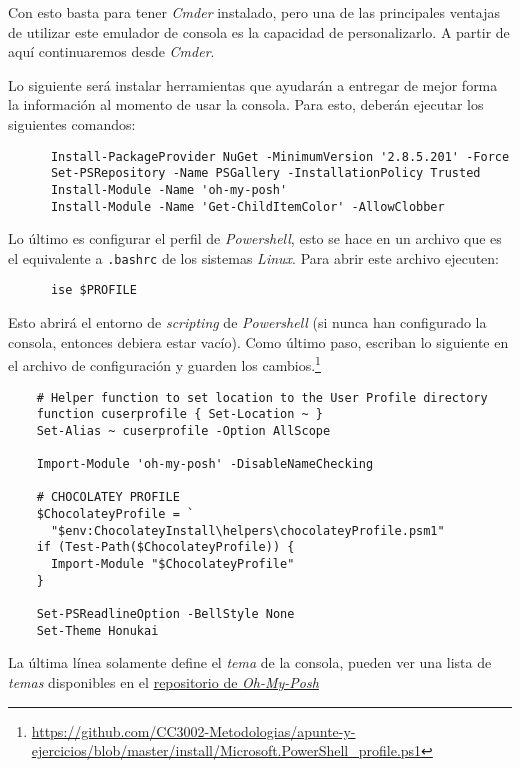     Con esto basta para tener \textit{Cmder} instalado, pero una de las principales ventajas
    de utilizar este emulador de consola es la capacidad de personalizarlo.
    A partir de aquí continuaremos desde \textit{Cmder}.
    
    Lo siguiente será instalar herramientas que ayudarán a entregar de mejor forma la información 
    al momento de usar la consola.
    Para esto, deberán ejecutar los siguientes comandos:

    \begin{verbatim}
      Install-PackageProvider NuGet -MinimumVersion '2.8.5.201' -Force
      Set-PSRepository -Name PSGallery -InstallationPolicy Trusted
      Install-Module -Name 'oh-my-posh'
      Install-Module -Name 'Get-ChildItemColor' -AllowClobber
    \end{verbatim}

    Lo último es configurar el perfil de \textit{Powershell}, esto se hace en un archivo que
    es el equivalente a \texttt{.bashrc} de los sistemas \textit{Linux}.
    Para abrir este archivo ejecuten:

    \begin{verbatim}
      ise $PROFILE
    \end{verbatim}

  Esto abrirá el entorno de \textit{scripting} de \textit{Powershell} (si nunca han 
  configurado la consola, entonces debiera estar vacío).
  Como último paso, escriban lo siguiente en el archivo de configuración y guarden los 
  cambios.\footnote{
    \url{https://github.com/CC3002-Metodologias/apunte-y-ejercicios/blob/master/install/Microsoft.PowerShell_profile.ps1}
  }

  \begin{verbatim}
    # Helper function to set location to the User Profile directory
    function cuserprofile { Set-Location ~ }
    Set-Alias ~ cuserprofile -Option AllScope

    Import-Module 'oh-my-posh' -DisableNameChecking

    # CHOCOLATEY PROFILE
    $ChocolateyProfile = `
      "$env:ChocolateyInstall\helpers\chocolateyProfile.psm1"
    if (Test-Path($ChocolateyProfile)) {
      Import-Module "$ChocolateyProfile"
    }

    Set-PSReadlineOption -BellStyle None
    Set-Theme Honukai
  \end{verbatim}

  La última línea solamente define el \textit{tema} de la consola, pueden ver una lista de
  \textit{temas} disponibles en el 
  \href{https://github.com/JanDeDobbeleer/oh-my-posh#themes}{repositorio de \textit{Oh-My-Posh}}

